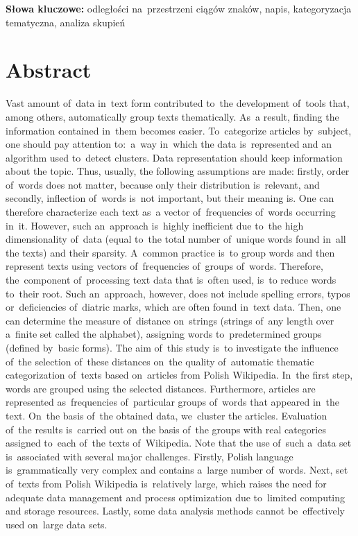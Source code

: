 \documentclass{praca1}
\begin{document}
\textbf{Słowa kluczowe:} odległości na~przestrzeni ciągów znaków, napis, kategoryzacja tematyczna, analiza skupień

\newpage

\section*{Abstract}

Vast amount of~data in~text form contributed to~the development of~tools that, among others, automatically group texts thematically. As~a result, finding the information contained in~them becomes easier. To~categorize articles by~subject, one should pay attention to:~a~way in~which the data is~represented and an algorithm used to~detect clusters. Data representation should keep information about the topic. Thus, usually, the following assumptions are made: firstly, order of~words does not matter, because only their distribution is~relevant, and secondly, inflection of~words is~not important, but their meaning is. One can therefore characterize each text as~a vector of~frequencies of~words occurring in~it. However, such an~approach is~highly inefficient due to~the high dimensionality of~data (equal to~the total number of~unique words found in~all the texts) and their sparsity. A~common practice is~to group words and then represent texts using vectors of~frequencies of~groups of~words. Therefore, the~component of~processing text data that is~often used, is~to reduce words to~their root. Such an~approach, however, does not include spelling errors, typos or~deficiencies of~diatric marks, which are often found in~text data. Then, one can determine the measure of~distance on~strings (strings of~any length over a~finite set called the alphabet), assigning words to~predetermined groups (defined by~basic forms). The aim of~this study is~to investigate the influence of~the selection of~these distances on~the quality of~automatic thematic categorization of~texts based on~articles from Polish Wikipedia. In~the first step, words are grouped using the selected distances. Furthermore, articles are represented as~frequencies of~particular groups of~words that appeared in~the text. On~the basis of~the obtained data, we~cluster the articles. Evaluation of~the results is~carried out on~the basis of~the groups with real categories assigned to~each of~the texts of~Wikipedia. Note that the use of~such a~data set is~associated with several major challenges. Firstly,  Polish language is~grammatically very complex and contains a~large number of~words. Next, set of~texts from Polish Wikipedia is~relatively large, which raises the need for adequate data management and process optimization due to~limited computing and storage resources. Lastly, some data analysis methods cannot be~effectively used on~large data sets.
\end{document}
